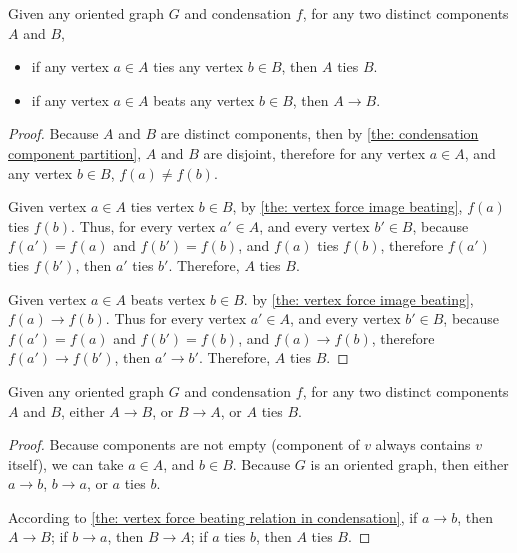 \begin{theorem}\label{the: vertex force beating relation in condensation}
  Given any oriented graph \(G\) and condensation \(f\),
  for any two distinct components \(A\) and \(B\),
  \begin{itemize}
    \item
      if any vertex \(a \in A\) ties any vertex \(b \in B\),
      then \(A\) ties \(B\).
    \item
      if any vertex \(a \in A\) beats any vertex \(b \in B\),
      then \(A \to B\).
  \end{itemize}
\end{theorem}

\begin{proof}
  Because \(A\) and \(B\) are distinct components,
  then by \cref{the: condensation component partition},
  \(A\) and \(B\) are disjoint,
  therefore for any vertex \(a \in A\),
  and any vertex \(b \in B\), \(f(a) \neq f(b)\).

  Given vertex \(a \in A\) ties vertex \(b \in B\),
  by \cref{the: vertex force image beating},
  \(f(a)\) ties \(f(b)\).
  Thus, for every vertex \(a' \in A\),
  and every vertex \(b' \in B\),
  because \(f(a') = f(a)\) and \(f(b') = f(b)\),
  and \(f(a)\) ties \(f(b)\), therefore \(f(a')\) ties \(f(b')\),
  then \(a'\) ties \(b'\).
  Therefore, \(A\) ties \(B\).

  Given vertex \(a \in A\) beats vertex \(b \in B\).
  by \cref{the: vertex force image beating},
  \(f(a) \to f(b)\).
  Thus for every vertex \(a' \in A\),
  and every vertex \(b' \in B\),
  because \(f(a') = f(a)\) and \(f(b') = f(b)\),
  and \(f(a) \to f(b)\), therefore \(f(a') \to f(b')\),
  then \(a' \to b'\).
  Therefore, \(A\) ties \(B\).
\end{proof}

\begin{corollary}\label{the: components are vertex in condensation}
  Given any oriented graph \(G\) and condensation \(f\),
  for any two distinct components \(A\) and \(B\),
  either \(A \to B\), or \(B \to A\), or \(A\) ties \(B\).
\end{corollary}

\begin{proof}
  Because components are not empty
  (component of \(v\) always contains \(v\) itself),
  we can take \(a \in A\), and \(b \in B\).
  Because \(G\) is an oriented graph,
  then either \(a \to b\), \(b \to a\), or \(a\) ties \(b\).

  According to \cref{the: vertex force beating relation in condensation},
  if \(a \to b\), then \(A \to B\);
  if \(b \to a\), then \(B \to A\);
  if \(a\) ties \(b\), then \(A\) ties \(B\).
\end{proof}

